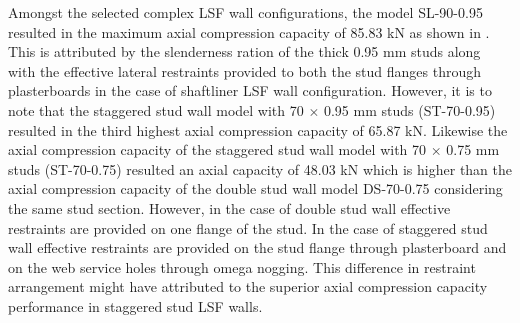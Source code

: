Amongst the selected complex LSF wall configurations, the model SL-90-0.95 resulted in the maximum axial compression capacity of 85.83 kN as shown in . This is attributed by the slenderness ration of the thick 0.95 mm studs along with the effective lateral restraints provided to both the stud flanges through plasterboards in the case of shaftliner LSF wall configuration. However, it is to note that the staggered stud wall model with 70 $\times$ 0.95 mm studs (ST-70-0.95) resulted in the third highest axial compression capacity of 65.87 kN. Likewise the axial compression capacity of the staggered stud wall model with 70 $\times$ 0.75 mm studs (ST-70-0.75) resulted an axial capacity of 48.03 kN which is higher than the axial compression capacity of the double stud wall model DS-70-0.75 considering the same stud section. However, in the case of double stud wall effective restraints are provided on one flange of the stud. In the case of staggered stud wall effective restraints are provided on the stud flange through plasterboard and on the web service holes through omega nogging. This difference in restraint arrangement might have attributed to the superior axial compression capacity performance in staggered stud LSF walls.
